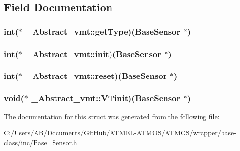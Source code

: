 \subsection{Field Documentation}
\hypertarget{struct___abstract__vmt_a06cf269c6b06098cd3e820eb993dd422}{
\subsubsection[{get\-Type}]{\setlength{\rightskip}{0pt plus 5cm}int($\ast$ \-\_\-\-Abstract\-\_\-vmt\-::get\-Type)({\bf Base\-Sensor} $\ast$)}}\label{struct___abstract__vmt_a06cf269c6b06098cd3e820eb993dd422}
\hypertarget{struct___abstract__vmt_aac6a2ceee8ce6dbda464db9dabc3864b}{
\subsubsection[{init}]{\setlength{\rightskip}{0pt plus 5cm}int($\ast$ \-\_\-\-Abstract\-\_\-vmt\-::init)({\bf Base\-Sensor} $\ast$)}}\label{struct___abstract__vmt_aac6a2ceee8ce6dbda464db9dabc3864b}
\hypertarget{struct___abstract__vmt_af1a8c2caa6f589005dc89c632f56fc40}{
\subsubsection[{reset}]{\setlength{\rightskip}{0pt plus 5cm}int($\ast$ \-\_\-\-Abstract\-\_\-vmt\-::reset)({\bf Base\-Sensor} $\ast$)}}\label{struct___abstract__vmt_af1a8c2caa6f589005dc89c632f56fc40}
\hypertarget{struct___abstract__vmt_a74e82c0ad9f3badb232406c888692d48}{
\subsubsection[{V\-Tinit}]{\setlength{\rightskip}{0pt plus 5cm}void($\ast$ \-\_\-\-Abstract\-\_\-vmt\-::\-V\-Tinit)({\bf Base\-Sensor} $\ast$)}}\label{struct___abstract__vmt_a74e82c0ad9f3badb232406c888692d48}


The documentation for this struct was generated from the following file\-:\begin{DoxyCompactItemize}
\item 
C\-:/\-Users/\-A\-B/\-Documents/\-Git\-Hub/\-A\-T\-M\-E\-L-\/\-A\-T\-M\-O\-S/\-A\-T\-M\-O\-S/wrapper/base-\/class/inc/\hyperlink{_base___sensor_8h}{Base\-\_\-\-Sensor.\-h}\end{DoxyCompactItemize}
